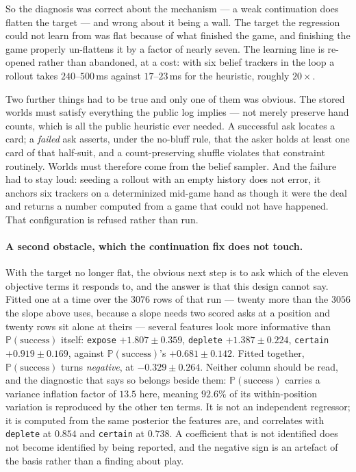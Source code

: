 \documentclass[11pt,a4paper]{article}
\newcommand{\Prob}{\ensuremath{\mathbb{P}}}
\begin{document}
So the diagnosis was correct about the mechanism --- a weak continuation does
flatten the target --- and wrong about it being a wall. The target the
regression could not learn from was flat because of what finished the game, and
finishing the game properly un-flattens it by a factor of nearly seven. The
learning line is re-opened rather than abandoned, at a cost: with six belief
trackers in the loop a rollout takes $240$--$500$\,ms against $17$--$23$\,ms for
the heuristic, roughly $20\times$.

Two further things had to be true and only one of them was obvious. The stored
worlds must satisfy everything the public log implies --- not merely preserve
hand counts, which is all the public heuristic ever needed. A successful ask
locates a card; a \emph{failed} ask asserts, under the no-bluff rule, that the
asker holds at least one card of that half-suit, and a count-preserving shuffle
violates that constraint routinely. Worlds must therefore come from the belief
sampler. And the failure had to stay loud: seeding a rollout with an empty
history does not error, it anchors six trackers on a determinized mid-game hand
as though it were the deal and returns a number computed from a game that could
not have happened. That configuration is refused rather than run.

\paragraph{A second obstacle, which the continuation fix does not touch.} With
the target no longer flat, the obvious next step is to ask which of the eleven
objective terms it responds to, and the answer is that this design cannot say.
Fitted one at a time over the $3076$ rows of that run --- twenty more than the
$3056$ the slope above uses, because a slope needs two scored asks at a position
and twenty rows sit alone at theirs --- several features look
more informative than $\Prob(\text{success})$ itself: \texttt{expose}
$+1.807 \pm 0.359$, \texttt{deplete} $+1.387 \pm 0.224$, \texttt{certain}
$+0.919 \pm 0.169$, against $\Prob(\text{success})$'s $+0.681 \pm 0.142$. Fitted
together, $\Prob(\text{success})$ turns \emph{negative}, at
$-0.329 \pm 0.264$. Neither column should be read, and the diagnostic that says
so belongs beside them: $\Prob(\text{success})$ carries a variance inflation
factor of $\mathbf{13.5}$ here, meaning $92.6\%$ of its within-position variation
is reproduced by the other ten terms. It is not an independent regressor; it is
computed from the same posterior the features are, and correlates with
\texttt{deplete} at $0.854$ and \texttt{certain} at $0.738$. A coefficient that
is not identified does not become identified by being reported, and the negative
sign is an artefact of the basis rather than a finding about play.
\end{document}
